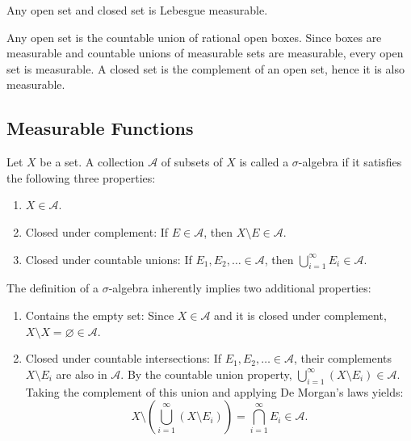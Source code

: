 \begin{theorem}
    Any open set and closed set is Lebesgue measurable.
\end{theorem}

\begin{pfbox}
    Any open set is the countable union of rational open boxes. Since boxes are measurable and countable unions of measurable sets are measurable, every open set is measurable.
    A closed set is the complement of an open set, hence it is also measurable.
\end{pfbox}


\subsection{Measurable Functions}


\begin{definition}
    Let $X$ be a set. A collection $\mathcal{A}$ of subsets of $X$ is called a $\sigma$-algebra if it satisfies the following three properties:
    \begin{enumerate}
        \item $X \in \mathcal{A}$.
        \item Closed under complement: If $E \in \mathcal{A}$, then $X \setminus E \in \mathcal{A}$.
        \item Closed under countable unions: If $E_1, E_2, \dots \in \mathcal{A}$, then $\displaystyle\bigcup_{i=1}^\infty E_i \in \mathcal{A}$.
    \end{enumerate}
\end{definition}

\begin{remark}
    The definition of a $\sigma$-algebra inherently implies two additional properties:
    \begin{enumerate}
        \item Contains the empty set: Since $X \in \mathcal{A}$ and it is closed under complement, $X \setminus X = \varnothing \in \mathcal{A}$.
        \item Closed under countable intersections: If $E_1, E_2, \dots \in \mathcal{A}$, their complements $X \setminus E_i$ are also in $\mathcal{A}$. By the countable union property, $\displaystyle\bigcup_{i=1}^\infty (X \setminus E_i) \in \mathcal{A}$. Taking the complement of this union and applying De Morgan's laws yields:
        \[ X \setminus \left( \bigcup_{i=1}^\infty (X \setminus E_i) \right) = \displaystyle\bigcap_{i=1}^\infty E_i \in \mathcal{A}. \]
    \end{enumerate}
\end{remark}

